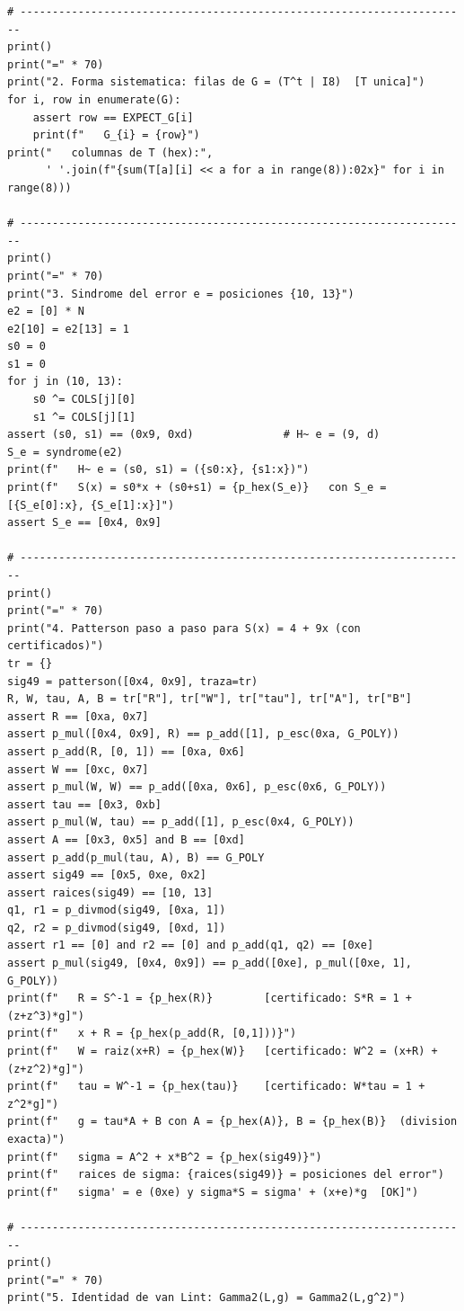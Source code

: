 \documentclass[11pt,a4paper,oneside]{report}
\begin{document}
\begin{lstlisting}
# ----------------------------------------------------------------------
print()
print("=" * 70)
print("2. Forma sistematica: filas de G = (T^t | I8)  [T unica]")
for i, row in enumerate(G):
    assert row == EXPECT_G[i]
    print(f"   G_{i} = {row}")
print("   columnas de T (hex):",
      ' '.join(f"{sum(T[a][i] << a for a in range(8)):02x}" for i in range(8)))

# ----------------------------------------------------------------------
print()
print("=" * 70)
print("3. Sindrome del error e = posiciones {10, 13}")
e2 = [0] * N
e2[10] = e2[13] = 1
s0 = 0
s1 = 0
for j in (10, 13):
    s0 ^= COLS[j][0]
    s1 ^= COLS[j][1]
assert (s0, s1) == (0x9, 0xd)              # H~ e = (9, d)
S_e = syndrome(e2)
print(f"   H~ e = (s0, s1) = ({s0:x}, {s1:x})")
print(f"   S(x) = s0*x + (s0+s1) = {p_hex(S_e)}   con S_e = [{S_e[0]:x}, {S_e[1]:x}]")
assert S_e == [0x4, 0x9]

# ----------------------------------------------------------------------
print()
print("=" * 70)
print("4. Patterson paso a paso para S(x) = 4 + 9x (con certificados)")
tr = {}
sig49 = patterson([0x4, 0x9], traza=tr)
R, W, tau, A, B = tr["R"], tr["W"], tr["tau"], tr["A"], tr["B"]
assert R == [0xa, 0x7]
assert p_mul([0x4, 0x9], R) == p_add([1], p_esc(0xa, G_POLY))
assert p_add(R, [0, 1]) == [0xa, 0x6]
assert W == [0xc, 0x7]
assert p_mul(W, W) == p_add([0xa, 0x6], p_esc(0x6, G_POLY))
assert tau == [0x3, 0xb]
assert p_mul(W, tau) == p_add([1], p_esc(0x4, G_POLY))
assert A == [0x3, 0x5] and B == [0xd]
assert p_add(p_mul(tau, A), B) == G_POLY
assert sig49 == [0x5, 0xe, 0x2]
assert raices(sig49) == [10, 13]
q1, r1 = p_divmod(sig49, [0xa, 1])
q2, r2 = p_divmod(sig49, [0xd, 1])
assert r1 == [0] and r2 == [0] and p_add(q1, q2) == [0xe]
assert p_mul(sig49, [0x4, 0x9]) == p_add([0xe], p_mul([0xe, 1], G_POLY))
print(f"   R = S^-1 = {p_hex(R)}        [certificado: S*R = 1 + (z+z^3)*g]")
print(f"   x + R = {p_hex(p_add(R, [0,1]))}")
print(f"   W = raiz(x+R) = {p_hex(W)}   [certificado: W^2 = (x+R) + (z+z^2)*g]")
print(f"   tau = W^-1 = {p_hex(tau)}    [certificado: W*tau = 1 + z^2*g]")
print(f"   g = tau*A + B con A = {p_hex(A)}, B = {p_hex(B)}  (division exacta)")
print(f"   sigma = A^2 + x*B^2 = {p_hex(sig49)}")
print(f"   raices de sigma: {raices(sig49)} = posiciones del error")
print(f"   sigma' = e (0xe) y sigma*S = sigma' + (x+e)*g  [OK]")

# ----------------------------------------------------------------------
print()
print("=" * 70)
print("5. Identidad de van Lint: Gamma2(L,g) = Gamma2(L,g^2)")


\end{lstlisting}
\end{document}
